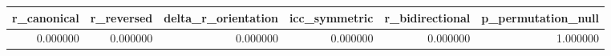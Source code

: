 \begin{tabular}{rrrrrr}
\toprule
r_canonical & r_reversed & delta_r_orientation & icc_symmetric & r_bidirectional & p_permutation_null \\
\midrule
0.000000 & 0.000000 & 0.000000 & 0.000000 & 0.000000 & 1.000000 \\
\bottomrule
\end{tabular}
